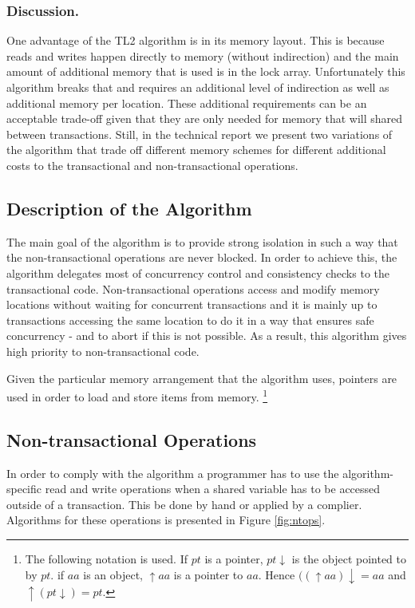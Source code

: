 \documentclass[runningheads,a4paper]{llncs}
\begin{document}
\subsubsection{Discussion.}
One advantage of the TL2 algorithm is in its memory layout.
This is because reads and writes happen directly to memory (without indirection)
and the main amount of additional memory that is used is in the lock array.
Unfortunately this algorithm breaks that and requires an additional level of indirection
as well as additional memory per location.
These additional requirements can be an acceptable trade-off given that they are only
needed for memory that will shared between transactions.
Still, in the technical report \cite{SItechrep} we present two variations of the algorithm that trade
off different memory schemes for different additional costs to the transactional and
non-transactional operations.


\subsection{Description of the Algorithm}

The main goal of the algorithm is to provide strong isolation 
in such a way that  the non-transactional  operations are never blocked. 
In order  to achieve this,  the algorithm delegates most of  
concurrency   control   and  consistency   checks   to  the   transactional
code. Non-transactional  
operations access and modify  memory  locations without waiting for concurrent transactions
 and it is mainly up to transactions accessing the same location to
do it in a way that ensures safe  
concurrency - and to abort if this  is not possible.  As a
result, this algorithm gives high  priority   to non-transactional code. 

Given the particular memory arrangement  that the algorithm uses,
pointers are used in order to load and store items from memory.
\footnote{The following  notation  is
used. If $pt$ is a pointer, $pt\downarrow$ is the object pointed to by $pt$. 
if $aa$ is an object, $\uparrow aa$ is a pointer to $aa$. Hence 
$((\uparrow aa)\downarrow =aa$ and $ \uparrow(pt \downarrow)=pt$.}



\subsection{Non-transactional Operations}
In  order  to  comply  with  the  algorithm a  programmer  has  to  use  the
algorithm-specific   read  and write  operations when a shared variable has  to be
accessed outside of a transaction.  This be done by hand or applied by a complier.
Algorithms for these operations is presented in Figure \ref{fig:ntops}. 
\end{document}
